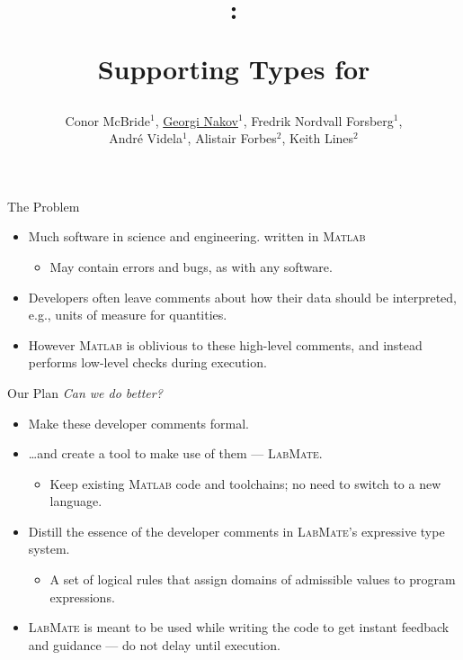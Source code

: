 \documentclass[]{beamer}
\title{\huge \lm: \\ \centerline{Supporting Types for \ma} }
\author[McBride, Nakov, Nordvall Forsberg et al]{\small Conor McBride$^{1}$, \underline{Georgi Nakov}$^{1}$, Fredrik Nordvall Forsberg$^{1}$,\\ Andr\'e Videla$^{1}$, Alistair Forbes$^{2}$, Keith Lines$^{2}$}
\institute[]{$^{1}$University of Strathclyde, UK\\$^{2}$National Physical Laboratory, UK}
\newcommand{\lm}{\textsc{LabMate}\xspace}
\newcommand{\ma}{\textsc{Matlab}\xspace}
\begin{document}
\begin{frame}[plain]
  \titlepage
\end{frame}

\setcounter{framenumber}{0}

\begin{frame}{The Problem}
  \begin{itemize}
  \item Much software in science and engineering.
    written in \ma
    \smallskip
    \begin{itemize}
    \item May contain errors and bugs, as with any software.
    \end{itemize}
    \bigskip
  \item Developers often leave comments about how their data should be
    interpreted, e.g., units of measure for quantities.
    \bigskip
  \item However \ma is oblivious to these high-level comments, and
    instead performs low-level %
    checks during execution.
  \end{itemize}
\end{frame}

\begin{frame}{Our Plan}
  \textit{Can we do better?}
  
  \begin{itemize}
    \medskip
  \item Make these developer comments formal.
    \medskip
  \item \ldots and create a tool to make use of them --- \lm.
    \begin{itemize}
      \smallskip
    \item Keep existing \ma code and toolchains; no need to
      switch to a new language.
    \end{itemize}
    \medskip
  \item Distill the essence of the developer comments in
    \lm's expressive type system.
    \begin{itemize}
      \smallskip
    \item A set of logical rules that assign domains of admissible
      values to program expressions.
    \end{itemize}
    \medskip
  \item \lm is meant to be used while writing the code to get instant
    feedback and guidance --- do not delay until execution.
  \end{itemize}
\end{frame}
\end{document}
